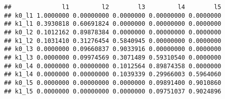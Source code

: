 \documentclass[
]{book}
\newenvironment{Shaded}{\begin{snugshade}}{\end{snugshade}}
\newcommand{\AttributeTok}[1]{\textcolor[rgb]{0.13,0.29,0.53}{#1}}
\newcommand{\FunctionTok}[1]{\textcolor[rgb]{0.13,0.29,0.53}{\textbf{#1}}}
\newcommand{\NormalTok}[1]{#1}
\newcommand{\OtherTok}[1]{\textcolor[rgb]{0.56,0.35,0.01}{#1}}
\newcommand{\SpecialCharTok}[1]{\textcolor[rgb]{0.81,0.36,0.00}{\textbf{#1}}}
\newcommand{\StringTok}[1]{\textcolor[rgb]{0.31,0.60,0.02}{#1}}
\begin{document}
\begin{verbatim}
##              l1         l2        l3         l4        l5
## k0_l1 1.0000000 0.00000000 0.0000000 0.00000000 0.0000000
## k1_l1 0.3930818 0.60691824 0.0000000 0.00000000 0.0000000
## k0_l2 0.1012162 0.89878384 0.0000000 0.00000000 0.0000000
## k1_l2 0.1031410 0.31276454 0.5840945 0.00000000 0.0000000
## k0_l3 0.0000000 0.09660837 0.9033916 0.00000000 0.0000000
## k1_l3 0.0000000 0.09974569 0.3071489 0.59310540 0.0000000
## k0_l4 0.0000000 0.00000000 0.1012564 0.89874358 0.0000000
## k1_l4 0.0000000 0.00000000 0.1039339 0.29966003 0.5964060
## k0_l5 0.0000000 0.00000000 0.0000000 0.09891400 0.9010860
## k1_l5 0.0000000 0.00000000 0.0000000 0.09751037 0.9024896
\end{verbatim}

\begin{Shaded}
\end{Shaded}
\end{document}
